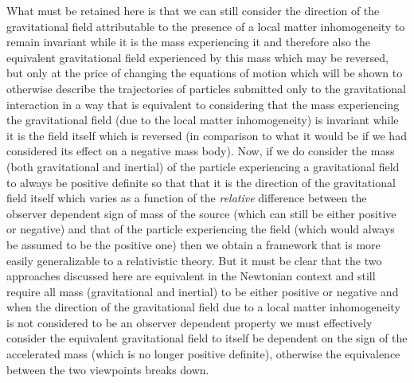 \documentclass[notitlepage,12pt]{report}
\begin{document}
What must be retained here is that we can still consider the direction of the gravitational field attributable to the presence of a local matter inhomogeneity to remain invariant while it is the mass experiencing it and therefore also the equivalent gravitational field experienced by this mass which may be reversed, but only at the price of changing the equations of motion which will be shown to otherwise describe the trajectories of particles submitted only to the gravitational interaction in a way that is equivalent to considering that the mass experiencing the gravitational field (due to the local matter inhomogeneity) is invariant while it is the field itself which is reversed (in comparison to what it would be if we had considered its effect on a negative mass body). Now, if we do consider the mass (both gravitational and inertial) of the particle experiencing a gravitational field to always be positive definite so that that it is the direction of the gravitational field itself which varies as a function of the \textit{relative} difference between the observer dependent sign of mass of the source (which can still be either positive or negative) and that of the particle experiencing the field (which would always be assumed to be the positive one) then we obtain a framework that is more easily generalizable to a relativistic theory. But it must be clear that the two approaches discussed here are equivalent in the Newtonian context and still require all mass (gravitational and inertial) to be either positive or negative and when the direction of the gravitational field due to a local matter inhomogeneity is not considered to be an observer dependent property we must effectively consider the equivalent gravitational field to itself be dependent on the sign of the accelerated mass (which is no longer positive definite), otherwise the equivalence between the two viewpoints breaks down.
\end{document}
